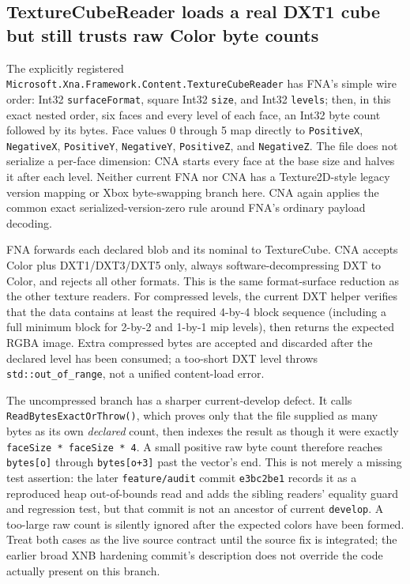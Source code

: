 \subsection{TextureCubeReader loads a real DXT1 cube but still trusts raw Color byte counts}
\label{sec:xnb-texturecube-reader-contract}

The explicitly registered \texttt{Microsoft.Xna.Framework.Content.TextureCubeReader} has FNA's
simple wire order: Int32 \texttt{surfaceFormat}, square Int32 \texttt{size}, and Int32
\texttt{levels}; then, in this exact nested order, six faces and every level of each face, an
Int32 byte count followed by its bytes. Face values 0 through 5 map directly to
\texttt{PositiveX}, \texttt{NegativeX}, \texttt{PositiveY}, \texttt{NegativeY},
\texttt{PositiveZ}, and \texttt{NegativeZ}. The file does not serialize a per-face dimension:
CNA starts every face at the base size and halves it after each level. Neither current FNA nor CNA
has a Texture2D-style legacy version mapping or Xbox byte-swapping branch here. CNA again applies
the common exact serialized-version-zero rule around FNA's ordinary payload decoding.

FNA forwards each declared blob and its nominal  to TextureCube. CNA
accepts Color plus DXT1/DXT3/DXT5 only, always software-decompressing DXT to Color, and rejects
all other formats. This is the same format-surface reduction as the other texture readers. For
compressed levels, the current DXT helper verifies that the data contains at least the required
4-by-4 block sequence (including a full minimum block for 2-by-2 and 1-by-1 mip levels), then
returns the expected RGBA image. Extra compressed bytes are accepted and discarded after the
declared level has been consumed; a too-short DXT level throws \texttt{std::out\_of\_range}, not
a unified content-load error.

The uncompressed branch has a sharper current-develop defect. It calls
\texttt{ReadBytesExactOrThrow()}, which proves only that the file supplied as many bytes as its
own \emph{declared} count, then indexes the result as though it were exactly
\texttt{faceSize * faceSize * 4}. A small positive raw byte count therefore reaches
\texttt{bytes[o]} through \texttt{bytes[o+3]} past the vector's end. This is not merely a missing
test assertion: the later \texttt{feature/audit} commit \texttt{e3bc2be1} records it as a
reproduced heap out-of-bounds read and adds the sibling readers' equality guard and regression
test, but that commit is not an ancestor of current \texttt{develop}. A too-large raw count is
silently ignored after the expected colors have been formed. Treat both cases as the live source
contract until the source fix is integrated; the earlier broad XNB hardening commit's description
does not override the code actually present on this branch.

